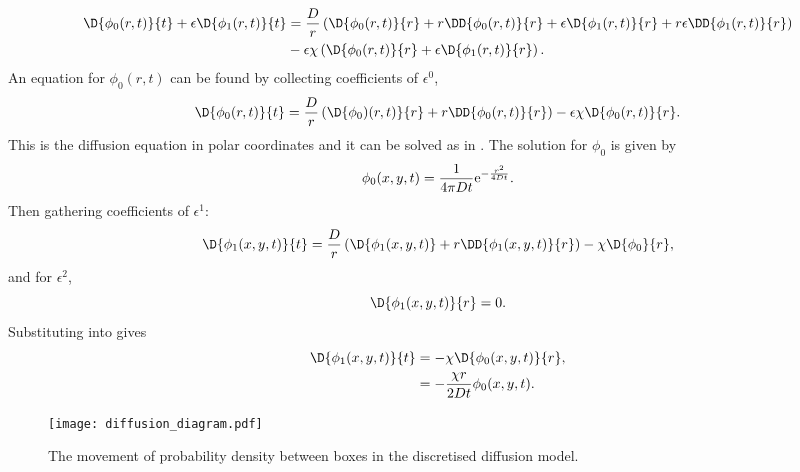 %
\begin{equation}
\begin{split}
  \D{\phi_0(r,t)}{t} + \epsilon\D{\phi_1(r,t)}{t} &= \frac{D}{r} \left( \D{\phi_0(r,t)}{r} + r \DD{\phi_0(r,t)}{r} + \epsilon\D{\phi_1(r,t)}{r} + r\epsilon \DD{\phi_1(r,t)}{r}\right)  \\
  &- \epsilon\chi \left( \D{\phi_0(r,t)}{r} + \epsilon \D{\phi_1(r,t)}{r} \right) .
  \end{split}
\end{equation}
%
An equation for $\phi_0(r,t)$ can be found by collecting coefficients of $\epsilon^0$,
%
\begin{equation}
  \D{\phi_0(r,t)}{t} = \frac{D}{r} \left(\D{\phi_0)(r,t)}{r} + r\DD{\phi_0(r,t)}{r}\right) - \epsilon\chi \D{\phi_0(r,t)}{r}.
  \label{eqn:diffusion_eps0}
\end{equation}
%
This is the diffusion equation in polar coordinates and it can be solved as in . The solution for $\phi_0$ is given by
%
\begin{equation}
  \phi_0(x,y,t) = \frac{1}{4\pi Dt}\mathrm{e}^{-\frac{r^2}{4Dt}}.\\
  \label{eqn:phi_0}
\end{equation}
%
Then gathering coefficients of $\epsilon^1$:
%
\begin{equation}
\D{\phi_1(x,y,t)}{t} = \frac{D}{r}\left(\D{\phi_1(x,y,t)} + r \DD{\phi_1(x,y,t)}{r}\right) - \chi\D{\phi_0}{r},
\label{eqn:eps1}
\end{equation}
%
and for $\epsilon^2$,
%
\begin{equation}
\D{\phi_1(x,y,t)}{r} = 0 .
\label{eqn:eps2}
\end{equation}
%
Substituting  into  gives
%
\begin{equation}
\begin{split}
  \D{\phi_1(x,y,t)}{t} &= - \chi\D{\phi_0(x,y,t)}{r}, \\
                       &= - \frac{\chi r}{2Dt} \phi_0(x,y,t) .
\end{split}
\end{equation}


 \begin{figure} [t]
     \centering
         \texttt{[image: diffusion\_diagram.pdf]}
         \caption{The movement of probability density between boxes in the discretised diffusion model.}
     \label{fig:diffusion_diagram}
 \end{figure}

